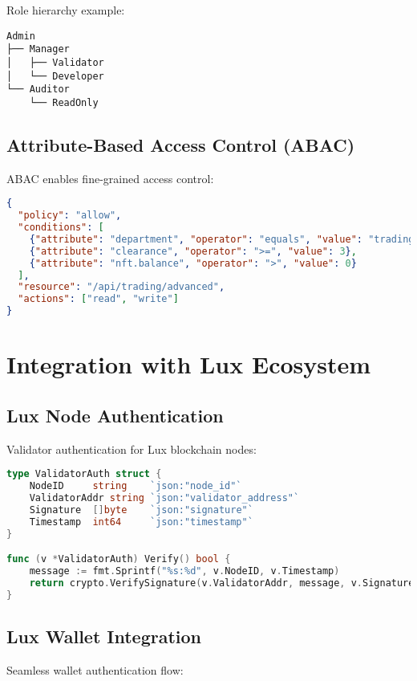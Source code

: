 \documentclass[11pt,a4paper]{article}
\begin{document}
Role hierarchy example:

\begin{lstlisting}
Admin
├── Manager
│   ├── Validator
│   └── Developer
└── Auditor
    └── ReadOnly
\end{lstlisting}

\subsection{Attribute-Based Access Control (ABAC)}

ABAC enables fine-grained access control:

\begin{lstlisting}[language=json]
{
  "policy": "allow",
  "conditions": [
    {"attribute": "department", "operator": "equals", "value": "trading"},
    {"attribute": "clearance", "operator": ">=", "value": 3},
    {"attribute": "nft.balance", "operator": ">", "value": 0}
  ],
  "resource": "/api/trading/advanced",
  "actions": ["read", "write"]
}
\end{lstlisting}

\section{Integration with Lux Ecosystem}

\subsection{Lux Node Authentication}

Validator authentication for Lux blockchain nodes:

\begin{lstlisting}[language=Go]
type ValidatorAuth struct {
    NodeID     string    `json:"node_id"`
    ValidatorAddr string `json:"validator_address"`
    Signature  []byte    `json:"signature"`
    Timestamp  int64     `json:"timestamp"`
}

func (v *ValidatorAuth) Verify() bool {
    message := fmt.Sprintf("%s:%d", v.NodeID, v.Timestamp)
    return crypto.VerifySignature(v.ValidatorAddr, message, v.Signature)
}
\end{lstlisting}

\subsection{Lux Wallet Integration}

Seamless wallet authentication flow:
\end{document}
